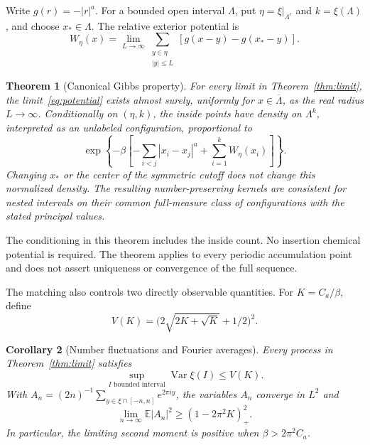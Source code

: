 \documentclass[11pt]{article}
\newtheorem{theorem}{Theorem}[section]
\newtheorem{corollary}[theorem]{Corollary}
\theoremstyle{remark}\newtheorem{remark}[theorem]{Remark}
\newcommand{\E}{\mathbb E}
\newcommand{\Var}{\operatorname{Var}}
\begin{document}
Write $g(r)=-|r|^a$. For a bounded open interval $\Lambda$, put
$\eta=\xi|_{\Lambda^c}$ and $k=\xi(\Lambda)$, and choose
$x_*\in\Lambda$. The relative exterior potential is
\begin{equation}\label{eq:potential}
 W_\eta(x)=\lim_{L\to\infty}
       \sum_{\substack{y\in\eta\\|y|\le L}}
                [g(x-y)-g(x_*-y)].
\end{equation}
\begin{theorem}[Canonical Gibbs property]\label{thm:DLR}
For every limit in Theorem~\ref{thm:limit}, the
limit~\eqref{eq:potential} exists almost surely, uniformly for
$x\in\overline\Lambda$, as the real radius $L\to\infty$.
Conditionally on $(\eta,k)$, the inside points have density on
$\Lambda^k$, interpreted as an unlabeled configuration, proportional
to
\begin{equation}\label{eq:gibbs}
 \exp\left\{-\beta\left[
        -\sum_{i<j}|x_i-x_j|^a+\sum_{i=1}^kW_\eta(x_i)
                         \right]\right\}.
\end{equation}
Changing $x_*$ or the center of the symmetric cutoff does not
change this normalized density. The resulting number-preserving
kernels are consistent for nested intervals on their common full-measure
class of configurations with the stated principal values.
\end{theorem}

The conditioning in this theorem includes the inside count. No
insertion chemical potential is required. The theorem applies to
every periodic accumulation point and does not assert uniqueness
or convergence of the full sequence.

The matching also controls two directly observable quantities. For
$K=C_a/\beta$, define
\[
 V(K)=\bigl(2\sqrt{2K+\sqrt K}+1/2\bigr)^2.
\]
\begin{corollary}[Number fluctuations and Fourier averages]\label{cor:number}
Every process in Theorem~\ref{thm:limit} satisfies
\begin{equation}\label{eq:number-variance}
 \sup_{I\text{ bounded interval}}\Var\xi(I)\le V(K).
\end{equation}
With $A_n=(2n)^{-1}\sum_{y\in\xi\cap[-n,n]}e^{2\pi iy}$,
the variables $A_n$ converge in $L^2$ and
\begin{equation}\label{eq:fourier-bound}
 \lim_{n\to\infty}\E|A_n|^2\ge(1-2\pi^2K)_+^2.
\end{equation}
In particular, the limiting second moment is positive when
$\beta>2\pi^2C_a$.
\end{corollary}
\end{document}
